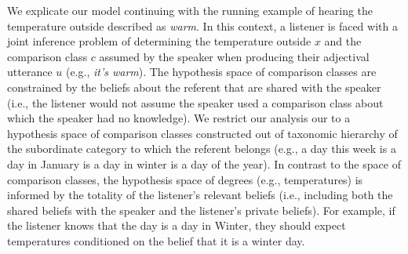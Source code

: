 \documentclass[doc]{apa6}
\begin{document}
We explicate our model continuing with the running example of hearing the temperature outside described as \emph{warm}. 
In this context, a listener is faced with a joint inference problem of determining the temperature outside $x$ and the comparison class  $c$ assumed by the speaker when producing their adjectival utterance $u$ (e.g., \emph{it's warm}).
The hypothesis space of comparison classes are constrained by the beliefs about the referent that are shared with the speaker (i.e., the listener would not assume the speaker used a comparison class about which the speaker had no knowledge). 
We restrict our analysis our to a hypothesis space of comparison classes constructed out of taxonomic hierarchy of the subordinate category to which the referent belongs (e.g., a day this week is a day in January is a day in winter is a day of the year).
In contrast to the space of comparison classes, the hypothesis space of degrees (e.g., temperatures) is informed by the totality of the listener's relevant beliefs (i.e., including both the shared beliefs with the speaker and the listener's private beliefs).
For example, if the listener knows that the day is a day in Winter, they should expect temperatures conditioned on the belief that it is a winter day.


%
%
%
%
%
\end{document}
